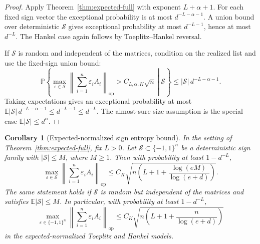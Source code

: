 \documentclass[11pt]{amsart}
\numberwithin{equation}{section}
\newtheorem{corollary}[theorem]{Corollary}
\theoremstyle{definition}
\theoremstyle{remark}
\newcommand{\op}{\mathrm{op}}
\newcommand{\Prob}{\mathbb P}
\newcommand{\Exp}{\mathbb E}
\newcommand{\norm}[1]{\left\lVert #1\right\rVert}
\newcommand{\abs}[1]{\left\lvert #1\right\rvert}
\newcommand{\eps}{\varepsilon}
\begin{document}
\begin{proof}
Apply Theorem~\ref{thm:expected-full} with exponent \(L+\alpha+1\).  For each
fixed sign vector the exceptional probability is at most
\(d^{-L-\alpha-1}\).  A union bound over deterministic \(\mathcal S\) gives
exceptional probability at most \(d^{-L-1}\), hence at most \(d^{-L}\).  The
Hankel case again follows by Toeplitz--Hankel reversal.

If \(\mathcal S\) is random and independent of the matrices, condition on the
realized list and use the fixed-sign union bound:
\[
  \Prob\left\{\left.
  \max_{\eps\in\mathcal S}
  \norm{\sum_{i=1}^n\eps_iA_i}_{\op}
  > C_{L,\alpha,K}\sqrt n
  \ \right|\ \mathcal S\right\}
  \le \abs{\mathcal S}\,d^{-L-\alpha-1}.
\]
Taking expectations gives an exceptional probability at most
\(\Exp\abs{\mathcal S}\,d^{-L-\alpha-1}\le d^{-L-1}\le d^{-L}\).  The
almost-sure size assumption is the special case
\(\Exp\abs{\mathcal S}\le d^\alpha\).
\end{proof}

\begin{corollary}[Expected-normalized sign entropy bound]
\label{cor:expected-sign-entropy}
In the setting of Theorem~\ref{thm:expected-full}, fix \(L>0\).  Let
\(\mathcal S\subset\{-1,1\}^n\) be a deterministic sign family with
\(\abs{\mathcal S}\le M\), where \(M\ge1\).  Then with probability at least
\(1-d^{-L}\),
\[
  \max_{\eps\in\mathcal S}
  \norm{\sum_{i=1}^n\eps_iA_i}_{\op}
  \le
  C_K\sqrt{n\left(L+1+\frac{\log(eM)}{\log(e+d)}\right)} .
\]
The same statement holds if \(\mathcal S\) is random but independent of the
matrices and satisfies \(\Exp\abs{\mathcal S}\le M\).  In particular, with
probability at least \(1-d^{-L}\),
\[
  \max_{\eps\in\{-1,1\}^n}
  \norm{\sum_{i=1}^n\eps_iA_i}_{\op}
  \le
  C_K\sqrt{n\left(L+1+\frac{n}{\log(e+d)}\right)}
\]
in the expected-normalized Toeplitz and Hankel models.
\end{corollary}
\end{document}
